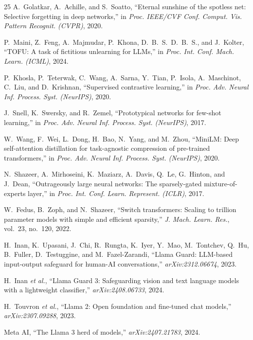 \documentclass[lettersize,journal]{IEEEtran}
\begin{document}
\begin{thebibliography}{25}
A.~Golatkar, A.~Achille, and S.~Soatto, ``Eternal sunshine of the spotless net: Selective forgetting in deep networks,'' in \textit{Proc. IEEE/CVF Conf. Comput. Vis. Pattern Recognit. (CVPR)}, 2020.

P.~Maini, Z.~Feng, A.~Majmudar, P.~Khona, D.~B.~S.~D.~B.~S., and J.~Kolter, ``{TOFU}: A task of fictitious unlearning for {LLMs},'' in \textit{Proc. Int. Conf. Mach. Learn. (ICML)}, 2024.

P.~Khosla, P.~Teterwak, C.~Wang, A.~Sarna, Y.~Tian, P.~Isola, A.~Maschinot, C.~Liu, and D.~Krishnan, ``Supervised contrastive learning,'' in \textit{Proc. Adv. Neural Inf. Process. Syst. (NeurIPS)}, 2020.

J.~Snell, K.~Swersky, and R.~Zemel, ``Prototypical networks for few-shot learning,'' in \textit{Proc. Adv. Neural Inf. Process. Syst. (NeurIPS)}, 2017.

W.~Wang, F.~Wei, L.~Dong, H.~Bao, N.~Yang, and M.~Zhou, ``{MiniLM}: Deep self-attention distillation for task-agnostic compression of pre-trained transformers,'' in \textit{Proc. Adv. Neural Inf. Process. Syst. (NeurIPS)}, 2020.

N.~Shazeer, A.~Mirhoseini, K.~Maziarz, A.~Davis, Q.~Le, G.~Hinton, and J.~Dean, ``Outrageously large neural networks: The sparsely-gated mixture-of-experts layer,'' in \textit{Proc. Int. Conf. Learn. Represent. (ICLR)}, 2017.

W.~Fedus, B.~Zoph, and N.~Shazeer, ``Switch transformers: Scaling to trillion parameter models with simple and efficient sparsity,'' \textit{J. Mach. Learn. Res.}, vol.~23, no.~120, 2022.

H.~Inan, K.~Upasani, J.~Chi, R.~Rungta, K.~Iyer, Y.~Mao, M.~Tontchev, Q.~Hu, B.~Fuller, D.~Testuggine, and M.~Fazel-Zarandi, ``Llama Guard: {LLM}-based input-output safeguard for human-{AI} conversations,'' \textit{arXiv:2312.06674}, 2023.

H.~Inan \textit{et al.}, ``Llama Guard 3: Safeguarding vision and text language models with a lightweight classifier,'' \textit{arXiv:2408.06733}, 2024.

H.~Touvron \textit{et al.}, ``Llama 2: Open foundation and fine-tuned chat models,'' \textit{arXiv:2307.09288}, 2023.

Meta AI, ``The {Llama} 3 herd of models,'' \textit{arXiv:2407.21783}, 2024.


\end{thebibliography}
\end{document}
